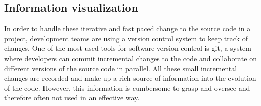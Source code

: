 \subsection{Information visualization}
In order to handle these iterative and fast paced change to the source code in a project, development teams are using a version control system to keep track of changes. One of the most used tools for software version control is git, a system where developers can commit incremental changes to the code and collaborate on different versions of the source code in parallel. All these small incremental changes are recorded and make up a rich source of information into the evolution of the code. However, this information is cumbersome to grasp and oversee and therefore often not used in an effective way.
